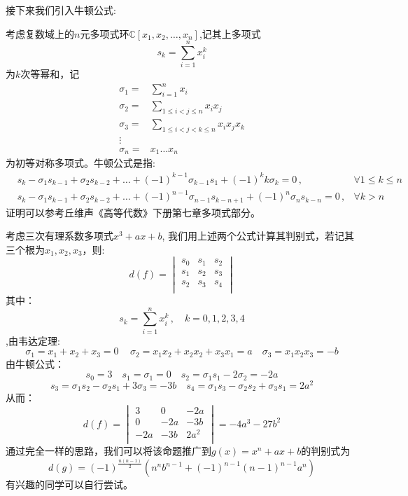 \documentclass[a4paper,12pt]{ctexart}
\begin{document}
接下来我们引入牛顿公式:

考虑复数域上的$n$元多项式环$\mathbb{C}[x_1,x_2,\dots,x_n]$,记其上多项式
$$s_k=\sum_{i=1}^{n}x_i^k$$为$k$次等幂和，记
\begin{align*}
    \sigma_1= & \sum_{i=1}^n x_i                \\
    \sigma_2= & \sum_{1\le i<j\le n}x_ix_j      \\
    \sigma_3= & \sum_{1\le i<j<k\le n}x_ix_jx_k \\
    \vdots                                      \\
    \sigma_n= & x_1\dots x_n
\end{align*}
为初等对称多项式。牛顿公式是指:
\begin{align*}
     & s_k-\sigma_1s_{k-1}+\sigma_2s_{k-2}+\dots+(-1)^{k-1}\sigma_{k-1}s_1+(-1)^{k}k\sigma_{k}=0\, ,\quad       & \forall 1\le k\le n \\
     & s_k-\sigma_1s_{k-1}+\sigma_2s_{k-2}+\dots+(-1)^{n-1}\sigma_{n-1}s_{k-n+1}+(-1)^{n}\sigma_{n}s_{k-n}=0\,, & \forall k>n
\end{align*}
证明可以参考丘维声《高等代数》下册第七章多项式部分。

考虑三次有理系数多项式$x^3+ax+b$,
我们用上述两个公式计算其判别式，若记其三个根为$x_1,x_2,x_3$，则:\begin{equation*}
    d(f)=\begin{vmatrix}
        s_0 & s_1 & s_2 \\
        s_1 & s_2 & s_3 \\
        s_2 & s_3 & s_4 \\
    \end{vmatrix}
\end{equation*}
其中：$$s_k=\sum_{i=1}^{n}x_i^k\,,\quad k=0,1,2,3,4$$,由韦达定理:
\begin{equation*}
    \sigma_1=x_1+x_2+x_3=0\,\quad  \sigma_2=x_1x_2+x_2x_2+x_3x_1=a\quad \sigma_3=x_1x_2x_3=-b
\end{equation*}
由牛顿公式：\begin{equation*}
    s_0=3\quad  s_1= \sigma_1=0\quad s_2=\sigma_1s_1-2\sigma_2=-2a
\end{equation*}
\begin{equation*}
    s_3=\sigma_1s_2-\sigma_2s_1+3\sigma_3=-3b\quad s_4=\sigma_1s_3-\sigma_2s_2+\sigma_3s_1=2a^2
\end{equation*}
从而：
\begin{equation*}
    d(f)=\begin{vmatrix}
        3   & 0   & -2a  \\
        0   & -2a & -3b  \\
        -2a & -3b & 2a^2 \\
    \end{vmatrix}=-4a^3-27b^2
\end{equation*}
通过完全一样的思路，我们可以将该命题推广到$g(x)=x^n+ax+b$的判别式为\begin{equation*}
    d(g)=(-1)^{\frac{n(n-1)}{2}}(n^nb^{n-1}+(-1)^{n-1}(n-1)^{n-1}a^n)
\end{equation*}
有兴趣的同学可以自行尝试。
\end{document}
